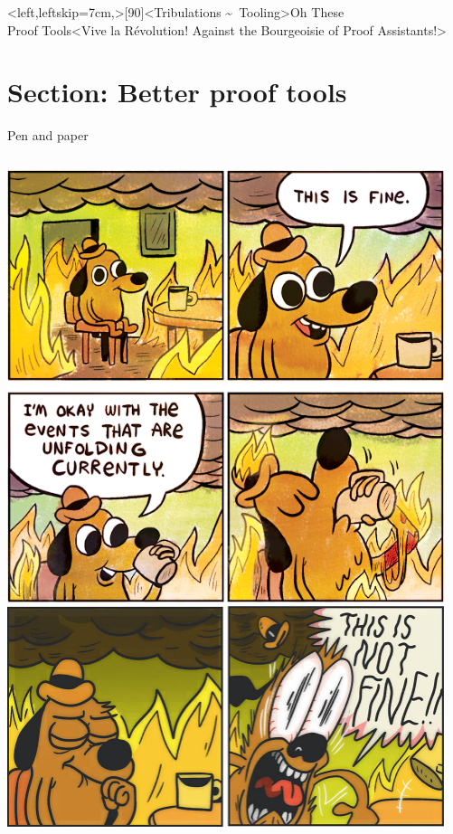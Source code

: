 \interlude*<left,leftskip=7cm,>[90]<Tribulations \textasciitilde\ Tooling>{Oh These\\Proof Tools}<Vive la Révolution! Against the Bourgeoisie of Proof Assistants!>
\hypertarget{section-better-proof-tools}{%
\section{Section: Better proof tools}\label{section-better-proof-tools}}

\begin{frame}{Pen and paper}
\hypertarget{problematic-proofs}{}
  \begin{columns}[c]
    \begin{column}{.35\linewidth}
      \includegraphics[width=\linewidth]{graphics/this-is-fine-crop.png}\\
      \includegraphics[width=\linewidth]{graphics/this-is-not-fine-crop.jpg}%
    \end{column}
    \hspace{1.2em}
    \begin{column}{.68\linewidth}
      \small


\end{column}
\end{columns}
\end{frame}
